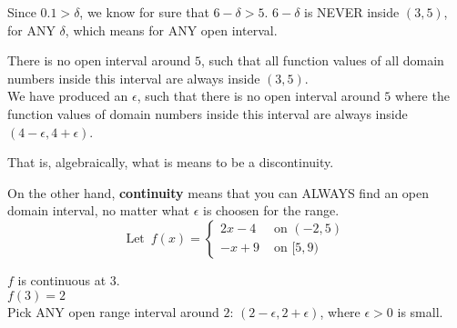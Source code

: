 \documentclass{ximera}
\begin{document}
\begin{example}
\begin{explanation}
\begin{image}
\end{image}












Since $0.1 > \delta$, we know for sure that $6 - \delta > 5$.  $6 - \delta$ is NEVER inside $(3, 5)$, for ANY $\delta$, which means for ANY open interval.

There is no open interval around $5$, such that all function values of all domain numbers inside this interval are always inside $(3,5)$. \\




We have produced an $\epsilon$, such that there is no open interval around $5$ where the function values of domain numbers inside this interval are always inside $(4-\epsilon , 4+\epsilon)$.


That is, algebraically, what is means to be a discontinuity.



\end{explanation}
\end{example}




On the other hand, \textbf{continuity} means that you can ALWAYS find an open domain interval, no matter what $\epsilon$ is choosen for the range. \\






\[
\text{Let } \, f(x) = 
\begin{cases}
  2x-4 & \text{ on } (-2, 5) \\
  -x + 9  & \text{ on } [5, 9)
\end{cases}
\]

$f$ is continuous at $3$. \\
$f(3)=2$ \\

Pick ANY open range interval around $2$:  $(2 - \epsilon, 2 + \epsilon)$, where $\epsilon > 0 $ is small. 
\end{document}

